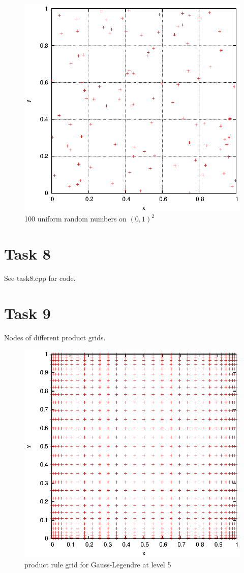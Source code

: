 \documentclass[]{article}
\begin{document}
\begin{figure}[!ht]
\centering
\includegraphics[width=.9\textwidth]{task7_uniform.eps}
\caption{100 uniform random numbers on $(0,1)^2$}
\label{fig:Task7b}
\end{figure}
\clearpage




\section*{Task 8}
See task8.cpp for code.

\section*{Task 9}
Nodes of different product grids.\\
\begin{figure}[!ht]
\centering
\includegraphics[width=.9\textwidth]{task9_gauss}
\caption{product rule grid for Gauss-Legendre at level 5}
\label{fig:Task9a}
\end{figure}
\end{document}
